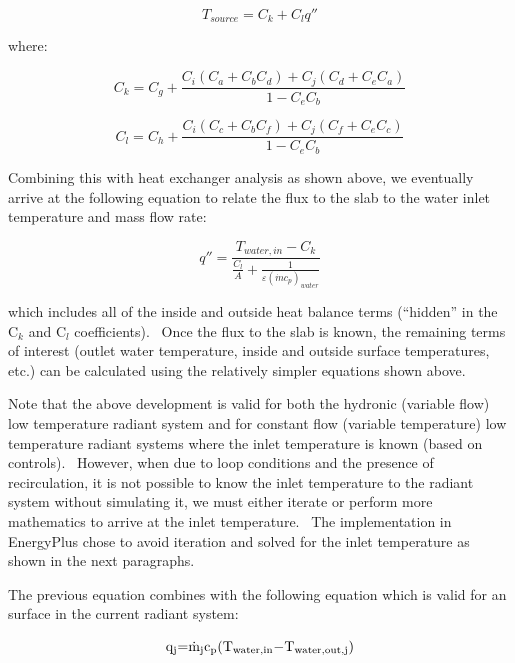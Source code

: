 {\begin{equation}
{T_{source}} = {C_k} + {C_l}q''
\end{equation}

where:

\begin{equation}
{C_k} = {C_g} + \frac{{{C_i}\left( {{C_a} + {C_b}{C_d}} \right) + {C_j}\left( {{C_d} + {C_e}{C_a}} \right)}}{{1 - {C_e}{C_b}}}
\end{equation}

\begin{equation}
{C_l} = {C_h} + \frac{{{C_i}\left( {{C_c} + {C_b}{C_f}} \right) + {C_j}\left( {{C_f} + {C_e}{C_c}} \right)}}{{1 - {C_e}{C_b}}}
\end{equation}

Combining this with heat exchanger analysis as shown above, we eventually arrive at the following equation to relate the flux to the slab to the water inlet temperature and mass flow rate:

\begin{equation}
q'' = \frac{{{T_{water,in}} - {C_k}}}{{\frac{{{C_l}}}{A} + \frac{1}{{\varepsilon {{\left( {\dot m{c_p}} \right)}_{water}}}}}}
\end{equation}

which includes all of the inside and outside heat balance terms (``hidden'' in the C\(_{k}\) and C\(_{l}\) coefficients).~ Once the flux to the slab is known, the remaining terms of interest (outlet water temperature, inside and outside surface temperatures, etc.) can be calculated using the relatively simpler equations shown above.

Note that the above development is valid for both the hydronic (variable flow) low temperature radiant system and for constant flow (variable temperature) low temperature radiant systems where the inlet temperature is known (based on controls).~ However, when due to loop conditions and the presence of recirculation, it is not possible to know the inlet temperature to the radiant system without simulating it, we must either iterate or perform more mathematics to arrive at the inlet temperature.~ The implementation in EnergyPlus chose to avoid iteration and solved for the inlet temperature as shown in the next paragraphs.

The previous equation combines with the following equation which is valid for an surface in the current radiant system:

\begin{equation}
{{\rm{q}}_{\rm{j}}}{\rm{  =  }}{{\rm{\dot m}}_{\rm{j}}}{{\rm{c}}_{\rm{p}}}{\rm{(}}{{\rm{T}}_{{\rm{water,in}}}}{\rm{  -  }}{{\rm{T}}_{{\rm{water,out,j}}}}{\rm{)}}
\end{equation}

}
